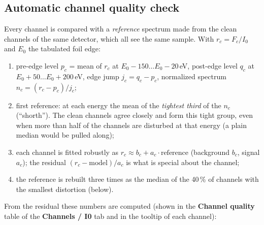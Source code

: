 \documentclass[11pt,a4paper]{article}
\newcommand{\ui}[1]{\textsf{\textbf{#1}}}          %
\begin{document}
\subsection{Automatic channel quality check}\label{sec:quality}
Every channel is compared with a \emph{reference} spectrum made from the clean channels of the
same detector, which all see the same sample. With $r_c = F_c/I_0$ and $E_0$ the tabulated foil edge:
\begin{enumerate}
  \item pre-edge level $p_c$ = mean of $r_c$ at $E_0-150\ldots E_0-20$\,eV, post-edge level $q_c$ at
        $E_0+50\ldots E_0+200$\,eV, edge jump $j_c = q_c-p_c$, normalized spectrum $n_c=(r_c-p_c)/j_c$;
  \item first reference: at each energy the mean of the \emph{tightest third} of the $n_c$ (``shorth'').
        The clean channels agree closely and form this tight group, even when more than half of
        the channels are disturbed at that energy (a plain median would be pulled along);
  \item each channel is fitted robustly as $r_c \approx b_c + a_c\cdot\text{reference}$ (background
        $b_c$, signal $a_c$); the residual $(r_c-\text{model})/a_c$ is what is special about the channel;
  \item the reference is rebuilt three times as the median of the 40\,\% of channels with the smallest
        distortion (below).
\end{enumerate}
From the residual these numbers are computed (shown in the \ui{Channel quality} table of the
\ui{Channels / I0} tab and in the tooltip of each channel):
\end{document}
